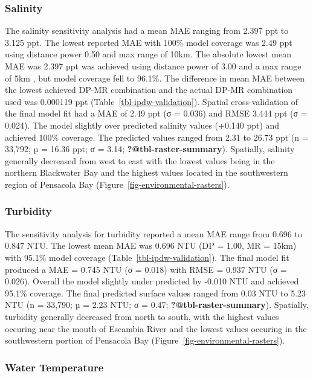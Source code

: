 \documentclass[
  review]{elsarticle}
\begin{document}
\subsubsection{Salinity}\label{salinity}

The salinity sensitivity analysis had a mean MAE ranging from 2.397 ppt
to 3.125 ppt. The lowest reported MAE with 100\% model coverage was 2.49
ppt using distance power 0.50 and max range of 10km. The absolute lowest
mean MAE was 2.397 ppt was achieved using distance power of 3.00 and a
max range of 5km , but model coverage fell to 96.1\%. The difference in
mean MAE between the lowest achieved DP-MR combination and the actual
DP-MR combination used was 0.000119 ppt
(Table~\ref{tbl-ipdw-validation}). Spatial cross-validation of the final
model fit had a MAE of 2.49 ppt (σ = 0.036) and RMSE 3.444 ppt (σ =
0.024). The model slightly over predicted salinity values (+0.140 ppt)
and achieved 100\% coverage. The predicted values ranged from 2.31 to
26.73 ppt (n = 33,792; µ = 16.36 ppt; σ = 3.14;
\textbf{?@tbl-raster-summary}). Spatially, salinity generally decreased
from west to east with the lowest values being in the northern
Blackwater Bay and the highest values located in the southwestern region
of Pensacola Bay (Figure~\ref{fig-environmental-rasters}).

\subsubsection{Turbidity}\label{turbidity}

The sensitivity analysis for turbidity reported a mean MAE range from
0.696 to 0.847 NTU. The lowest mean MAE was 0.696 NTU (DP = 1.00, MR =
15km) with 95.1\% model coverage (Table~\ref{tbl-ipdw-validation}). The
final model fit produced a MAE = 0.745 NTU (σ = 0.018) with RMSE = 0.937
NTU (σ = 0.026). Overall the model slightly under predicted by -0.010
NTU and achieved 95.1\% coverage. The final predicted surface values
ranged from 0.03 NTU to 5.23 NTU (n = 33,790; µ = 2.23 NTU; σ = 0.47;
\textbf{?@tbl-raster-summary}). Spatially, turbidity generally decreased
from north to south, with the highest values occuring near the mouth of
Escambia River and the lowest values occuring in the southwestern
portion of Pensacola Bay (Figure~\ref{fig-environmental-rasters}).

\subsubsection{Water Temperature}\label{water-temperature}
\end{document}
